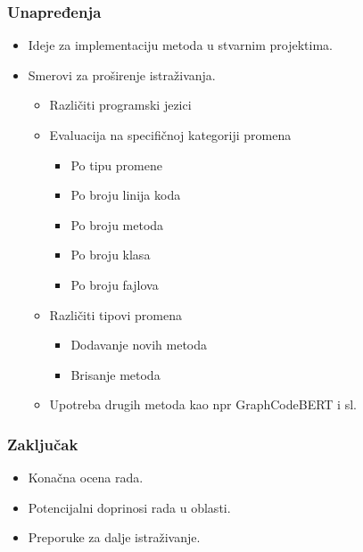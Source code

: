 \documentclass{beamer}
\begin{document}
\begin{frame}
\frametitle{Unapređenja}
\begin{itemize}
    \item Ideje za implementaciju metoda u stvarnim projektima.
    \item Smerovi za proširenje istraživanja.
    \begin{itemize}
        \item Različiti programski jezici
        \item Evaluacija na specifičnoj kategoriji promena
        \begin{itemize}
            \item Po tipu promene
            \item Po broju linija koda
            \item Po broju metoda
            \item Po broju klasa
            \item Po broju fajlova
        \end{itemize}
        \item Različiti tipovi promena
        \begin{itemize}
            \item Dodavanje novih metoda
            \item Brisanje metoda
        \end{itemize}
        \item Upotreba drugih metoda kao npr GraphCodeBERT i sl.
    \end{itemize}
\end{itemize}
\end{frame}

\begin{frame}
\frametitle{Zaključak}
\begin{itemize}
    \item Konačna ocena rada.
    \item Potencijalni doprinosi rada u oblasti.
    \item Preporuke za dalje istraživanje.
\end{itemize}
\end{frame}
\end{document}

